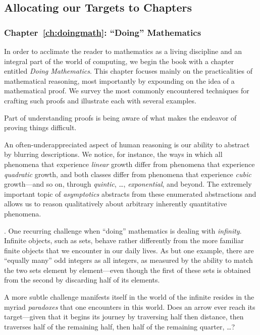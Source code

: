 \subsection{Allocating our Targets to Chapters}
\label{sec:the chapters}

\subsubsection{Chapter~\ref{ch:doingmath}: ``Doing'' Mathematics}

In order to acclimate the reader to mathematics as a living discipline
and an integral part of the world of computing, we begin the book with
a chapter entitled {\it Doing Mathematics}.  This chapter focuses
mainly on the practicalities of mathematical reasoning, most
importantly by expounding on the idea of a mathematical proof.  We
survey the most commonly encountered techniques for crafting such
proofs and illustrate each with several examples.

Part of understanding proofs is being aware of what makes the endeavor
of proving things difficult.

\medskip

%
An often-underappreciated aspect of human reasoning is our ability to
abstract by blurring descriptions.  We notice, for instance, the ways
in which all phenomena that experience {\em linear} growth differ from
phenomena that experience {\em quadratic} growth, and both classes
differ from phenomena that experience {\em cubic} growth---and so on,
through {\em quintic}, \ldots, {\em exponential}, and beyond.  The
extremely important topic of {\it asymptotics} abstracts from these
enumerated abstractions and allows us to reason qualitatively about
arbitrary inherently quantitative phenomena.

\medskip

.
One recurring challenge when ``doing'' mathematics is dealing with
{\em infinity}.  Infinite objects, such as sets, behave rather
differently from the more familiar finite objects that we encounter in
our daily lives.  As but one example, there are ``equally many'' odd
integers as all integers, as measured by the ability to match the two
sets element by element---even though the first of these sets is
obtained from the second by discarding half of its elements.

A more subtle challenge manifests itself in the world of the infinite
resides in the myriad {\em paradoxes} that one encounters in this
world.  Does an arrow ever reach its target---given that it begins its
journey by traversing half then distance, then traverses half of the
remaining half, then half of the remaining quarter, \ldots?

